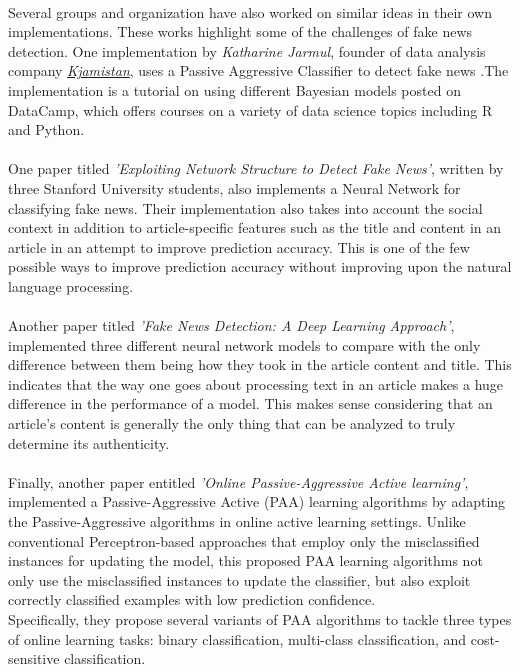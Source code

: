 \documentclass[11.5pt]{article}
\begin{document}
\begin{multicols}{2}
\paragraph{}
Several groups and organization have also worked on similar ideas in their own implementations. These works highlight some of the challenges of fake news detection. One implementation by \textit{Katharine Jarmul}, founder of data analysis company \href{run: https://kjamistan.com/}{\textit{Kjamistan}}, uses a Passive Aggressive Classiﬁer to detect fake news \citep{jarmul}.The implementation is a tutorial on using different Bayesian models posted on DataCamp\citep{jarmul},  which offers courses on a variety of data science topics including R and Python.

\paragraph{}
One paper titled \textit{’Exploiting Network Structure to Detect Fake News’}, written by three Stanford University students, also implements a Neural Network for classifying fake news\citep{rao}. Their implementation also takes into account the social context in addition to article-speciﬁc features such as the title and content in an article in an attempt to improve prediction accuracy. This is one of the few possible ways to improve prediction accuracy without improving upon the natural language processing.

\paragraph{}
Another paper titled \textit{'Fake News Detection: A Deep Learning Approach'}, implemented three different neural network models to compare with the only difference between them being how they took in the article content and title\citep{thota}.
This indicates that the way one goes about processing text in an article makes a huge difference in the performance of a model. This makes sense considering that an article’s content is generally the only thing that can be analyzed to truly determine its authenticity.

\paragraph{}
Finally, another paper entitled \textit{'Online Passive-Aggressive Active learning'}, implemented a Passive-Aggressive Active (PAA) learning algorithms by adapting the Passive-Aggressive algorithms in online active learning settings\cite{onlinepac}. Unlike conventional Perceptron-based approaches that employ only the misclassified instances for updating the model, this proposed PAA learning algorithms not only use the misclassified instances to update the classifier, but also exploit correctly classified examples with low prediction confidence.\\
Specifically, they propose several variants of PAA algorithms to tackle three types of online learning tasks: binary classification, multi-class classification, and cost-sensitive classification.


\end{multicols}
\end{document}
